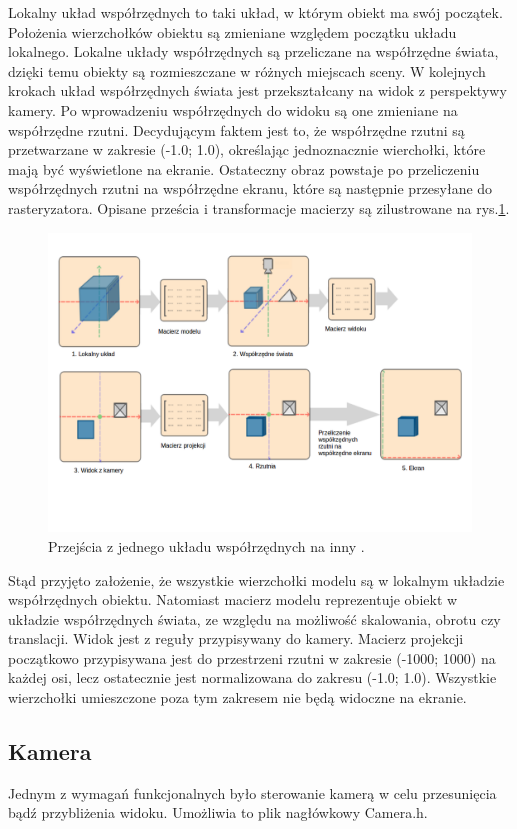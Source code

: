 Lokalny układ współrzędnych to taki układ, w którym obiekt ma swój początek. Położenia wierzchołków obiektu są zmieniane względem początku układu lokalnego. Lokalne układy współrzędnych są przeliczane na współrzędne świata, dzięki temu obiekty są rozmieszczane w różnych miejscach sceny. W kolejnych krokach układ współrzędnych świata jest przekształcany na widok z perspektywy kamery. Po wprowadzeniu współrzędnych do widoku są one zmieniane na współrzędne rzutni. Decydującym faktem jest to, że współrzędne rzutni są przetwarzane w zakresie (-1.0; 1.0), określając jednoznacznie wierchołki, które mają być wyświetlone na ekranie. Ostateczny obraz powstaje po przeliczeniu współrzędnych rzutni na współrzędne ekranu, które są następnie przesyłane do rasteryzatora. Opisane prześcia i transformacje macierzy są zilustrowane na rys.\ref{rys11}.
\begin{figure}[H]
		\centering
 		\includegraphics[width=12.0cm]{coordinate_systems.png}
    	\caption{Przejścia z jednego układu współrzędnych na inny \cite{opengltutorial}.}
 		\label{rys11}
\end{figure}
Stąd przyjęto założenie, że wszystkie wierzchołki modelu są w lokalnym układzie współrzędnych obiektu. Natomiast macierz modelu reprezentuje  obiekt w układzie współrzędnych świata, ze względu na możliwość skalowania, obrotu czy translacji. Widok jest z reguły przypisywany do kamery. Macierz projekcji początkowo przypisywana jest do przestrzeni rzutni w zakresie (-1000; 1000) na każdej osi, lecz ostatecznie jest normalizowana do zakresu (-1.0; 1.0). Wszystkie wierzchołki umieszczone poza tym zakresem nie będą widoczne na ekranie.

\subsection{Kamera}
Jednym z wymagań funkcjonalnych było sterowanie kamerą w celu przesunięcia bądź przybliżenia widoku. Umożliwia to plik nagłówkowy Camera.h.

